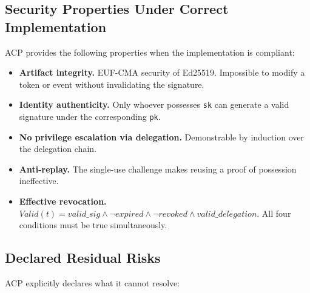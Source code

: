 \documentclass[11pt]{article}
\theoremstyle{definition}
\begin{document}
\subsection{Security Properties Under Correct Implementation}

ACP provides the following properties when the implementation is compliant:

\begin{itemize}[noitemsep]
  \item \textbf{Artifact integrity.}
        EUF-CMA security of Ed25519. Impossible to modify a token or event without invalidating the signature.
  \item \textbf{Identity authenticity.}
        Only whoever possesses \texttt{sk} can generate a valid signature under the corresponding \texttt{pk}.
  \item \textbf{No privilege escalation via delegation.}
        Demonstrable by induction over the delegation chain.
  \item \textbf{Anti-replay.}
        The single-use challenge makes reusing a proof of possession ineffective.
  \item \textbf{Effective revocation.}
        $\textit{Valid}(t) = \textit{valid\_sig} \wedge \neg\textit{expired} \wedge \neg\textit{revoked} \wedge \textit{valid\_delegation}$.
        All four conditions must be true simultaneously.
\end{itemize}

\subsection{Declared Residual Risks}

ACP explicitly declares what it cannot resolve:
\end{document}
